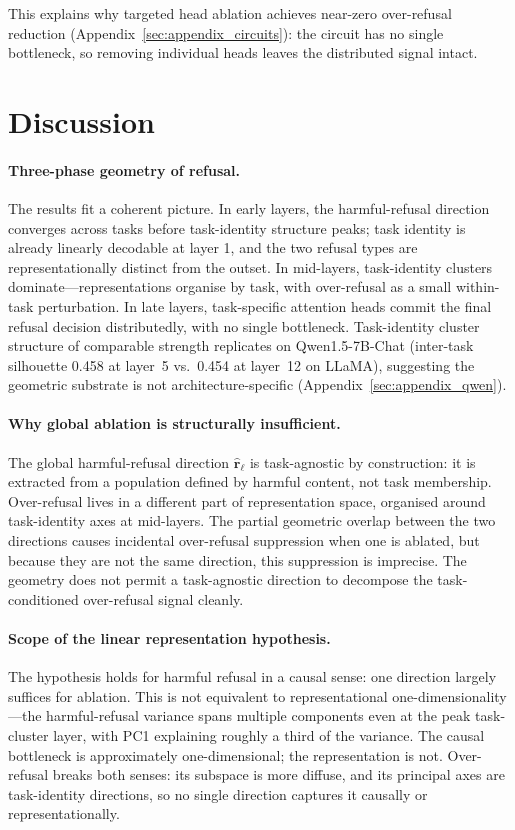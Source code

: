 \documentclass[11pt]{article}
\begin{document}
This explains why targeted head ablation achieves near-zero over-refusal
reduction (Appendix~\ref{sec:appendix_circuits}): the circuit has no single
bottleneck, so removing individual heads leaves the distributed signal intact.


\section{Discussion}
\label{sec:discussion}

\paragraph{Three-phase geometry of refusal.}
The results fit a coherent picture.
In early layers, the harmful-refusal direction converges across tasks before
task-identity structure peaks; task identity is already linearly decodable
at layer 1, and the two refusal types are representationally distinct from
the outset.
In mid-layers, task-identity clusters dominate---representations
organise by task, with over-refusal as a small within-task perturbation.
In late layers, task-specific attention heads commit the final refusal
decision distributedly, with no single bottleneck.
Task-identity cluster structure of comparable strength replicates on
Qwen1.5-7B-Chat (inter-task silhouette 0.458 at layer~5 vs.\ 0.454 at
layer~12 on LLaMA), suggesting the geometric substrate is not
architecture-specific (Appendix~\ref{sec:appendix_qwen}).

\paragraph{Why global ablation is structurally insufficient.}
The global harmful-refusal direction $\hat{\mathbf{r}}_\ell$ is task-agnostic
by construction: it is extracted from a population defined by harmful content,
not task membership.
Over-refusal lives in a different part of representation space, organised
around task-identity axes at mid-layers.
The partial geometric overlap between the two directions causes incidental
over-refusal suppression when one is ablated, but because they are not the
same direction, this suppression is imprecise.
The geometry does not permit a task-agnostic direction to decompose the
task-conditioned over-refusal signal cleanly.

\paragraph{Scope of the linear representation hypothesis.}
The hypothesis \citep{park2023linear} holds for harmful refusal in a causal
sense: one direction largely suffices for ablation.
This is not equivalent to representational one-dimensionality---the
harmful-refusal variance spans multiple components even at the peak
task-cluster layer, with PC1 explaining roughly a third of the variance.
The causal bottleneck is approximately one-dimensional; the representation
is not.
Over-refusal breaks both senses: its subspace is more diffuse, and its
principal axes are task-identity directions, so no single direction captures
it causally or representationally.
\end{document}
